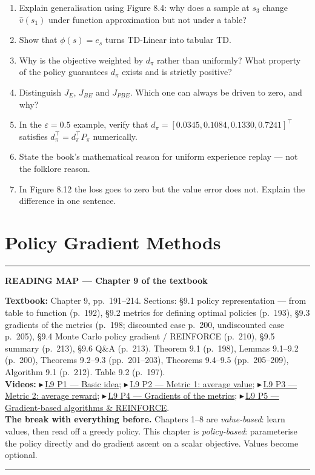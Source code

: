 \documentclass[11pt, letterpaper]{article}
\theoremstyle{runin}
\theoremstyle{runinplain}
\theoremstyle{remark}
\newcommand{\vid}[2]{{\color{vidred}\small$\playbutton$\,\href{#2}{\textsf{#1}}}}
\newcommand{\playbutton}{\blacktriangleright}
\newenvironment{roadmap}[1]
  {\par\medskip\noindent\rule{\textwidth}{0.9pt}\par\nobreak\vspace{0.25em}
   \noindent\textbf{\small READING MAP --- #1}\par\nobreak\vspace{0.15em}
   \small}
  {\par\nobreak\vspace{0.25em}\noindent\rule{\textwidth}{0.9pt}\par\medskip}
\begin{document}
\begin{enumerate}
  \item Explain generalisation using Figure 8.4: why does a sample at $s_3$ change
        $\hat v(s_1)$ under function approximation but not under a table?
  \item Show that $\phi(s)=e_s$ turns TD-Linear into tabular TD.
  \item Why is the objective weighted by $d_\pi$ rather than uniformly? What property
        of the policy guarantees $d_\pi$ exists and is strictly positive?
  \item Distinguish $J_E$, $J_{BE}$ and $J_{PBE}$. Which one can always be driven to
        zero, and why?
  \item In the $\varepsilon=0.5$ example, verify that
        $d_\pi=[0.0345,0.1084,0.1330,0.7241]^{\!\top}$ satisfies
        $d_\pi^{\!\top}=d_\pi^{\!\top}P_\pi$ numerically.
  \item State the book's mathematical reason for uniform experience replay --- not the
        folklore reason.
  \item In Figure 8.12 the loss goes to zero but the value error does not. Explain
        the difference in one sentence.
\end{enumerate}

\newpage
\section{Policy Gradient Methods}

\begin{roadmap}{Chapter 9 of the textbook}
\textbf{Textbook:} Chapter 9, pp.~191--214. Sections: \S9.1 policy representation ---
from table to function (p.~192), \S9.2 metrics for defining optimal policies (p.~193),
\S9.3 gradients of the metrics (p.~198; discounted case p.~200, undiscounted case
p.~205), \S9.4 Monte Carlo policy gradient / REINFORCE (p.~210), \S9.5 summary
(p.~213), \S9.6 Q\&A (p.~213). Theorem 9.1 (p.~198), Lemmas 9.1--9.2 (p.~200),
Theorems 9.2--9.3 (pp.~201--203), Theorems 9.4--9.5 (pp.~205--209),
Algorithm 9.1 (p.~212). Table 9.2 (p.~197).\\[0.3em]
\textbf{Videos:}
\vid{L9 P1 --- Basic idea}{https://www.youtube.com/watch?v=mtFHOj83QSo};
\vid{L9 P2 --- Metric 1: average value}{https://www.youtube.com/watch?v=la8jQc3hX1M};
\vid{L9 P3 --- Metric 2: average reward}{https://www.youtube.com/watch?v=8RZ_rQFe69E};
\vid{L9 P4 --- Gradients of the metrics}{https://www.youtube.com/watch?v=MvmtPXur3Ls};
\vid{L9 P5 --- Gradient-based algorithms \& REINFORCE}{https://www.youtube.com/watch?v=1DQnnUC8ng8}.\\[0.3em]
\textbf{The break with everything before.} Chapters 1--8 are \emph{value-based}: learn
values, then read off a greedy policy. This chapter is \emph{policy-based}: parameterise
the policy directly and do gradient ascent on a scalar objective. Values become
optional.
\end{roadmap}
\end{document}
